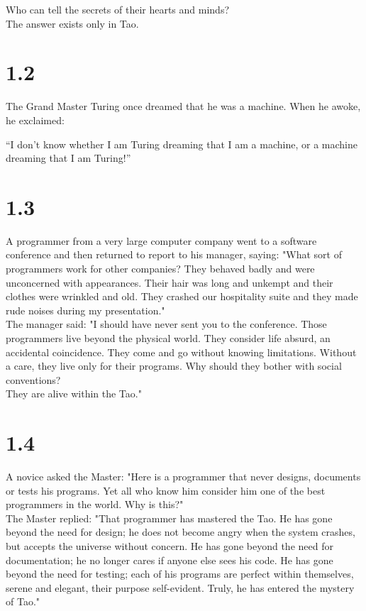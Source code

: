 \documentclass[14pt, letterpaper]{book}
\begin{document}
Who can tell the secrets of their hearts and minds? \\
The answer exists only in Tao.

\section*{1.2}
The Grand Master Turing once dreamed that he was a machine. When he awoke, he exclaimed:

``I don't know whether I am Turing dreaming that I am a machine, or a machine dreaming that I am Turing!''

\section*{1.3}
A programmer from a very large computer company went to a software conference and then returned to report to his manager, saying: "What sort of programmers work for other companies? They behaved badly and were unconcerned with appearances. Their hair was long and unkempt and their clothes were wrinkled and old. They crashed our hospitality suite and they made rude noises during my presentation."\\

The manager said: "I should have never sent you to the conference. Those programmers live beyond the physical world. They consider life absurd, an accidental coincidence. They come and go without knowing limitations. Without a care, they live only for their programs. Why should they bother with social conventions?\\

They are alive within the Tao."

\section*{1.4}
A novice asked the Master: "Here is a programmer that never designs, documents or tests his programs. Yet all who know him consider him one of the best programmers in the world. Why is this?"\\

The Master replied: "That programmer has mastered the Tao. He has gone beyond the need for design; he does not become angry when the system crashes, but accepts the universe without concern. He has gone beyond the need for documentation; he no longer cares if anyone else sees his code. He has gone beyond the need for testing; each of his programs are perfect within themselves, serene and elegant, their purpose self-evident. Truly, he has entered the mystery of Tao."
\end{document}
